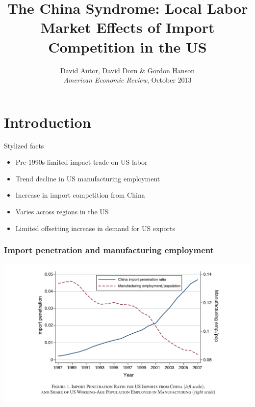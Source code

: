 \documentclass[notes=show]{beamer}
\begin{document}
\title{The China Syndrome: Local Labor Market Effects of Import Competition in the US}
\subtitle{}
\date{David Autor, David Dorn \& Gordon Hanson \bigskip \\
\textit{American Economic Review}, October 2013 }
\maketitle

\section{Introduction}

\begin{frame}{Stylized facts}
\begin{itemize}
\item Pre-1990s limited impact trade on US labor \bigskip
\item Trend decline in US manufacturing employment \bigskip
\item Increase in import competition from China \bigskip
\item Varies across regions in the US \bigskip
\item Limited offsetting increase in demand for US exports
\end{itemize}
\end{frame}

\begin{frame}
\frametitle{Import penetration and manufacturing employment}
\begin{center}
\includegraphics[width=\textwidth]{fig-1.pdf}%
\end{center}
\end{frame}
\end{document}
